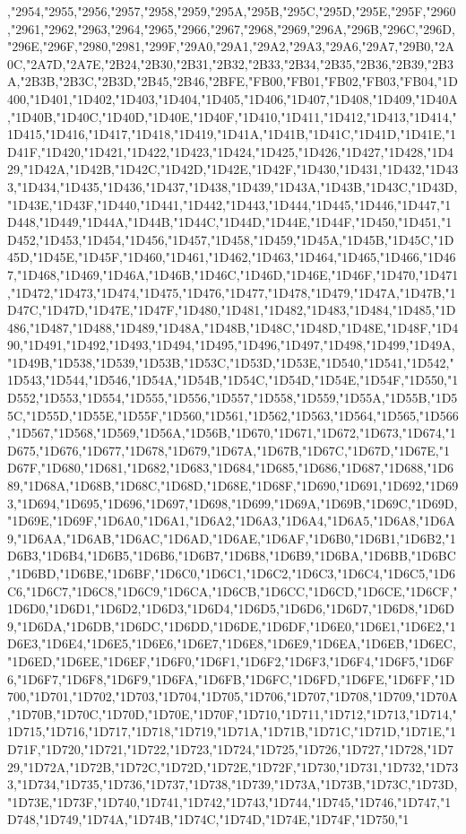 ,"2954,"2955,"2956,"2957,"2958,"2959,"295A,"295B,"295C,"295D,"295E,"295F,"2960,"2961,"2962,"2963,"2964,"2965,"2966,"2967,"2968,"2969,"296A,"296B,"296C,"296D,"296E,"296F,"2980,"2981,"299F,"29A0,"29A1,"29A2,"29A3,"29A6,"29A7,"29B0,"2A0C,"2A7D,"2A7E,"2B24,"2B30,"2B31,"2B32,"2B33,"2B34,"2B35,"2B36,"2B39,"2B3A,"2B3B,"2B3C,"2B3D,"2B45,"2B46,"2BFE,"FB00,"FB01,"FB02,"FB03,"FB04,"1D400,"1D401,"1D402,"1D403,"1D404,"1D405,"1D406,"1D407,"1D408,"1D409,"1D40A,"1D40B,"1D40C,"1D40D,"1D40E,"1D40F,"1D410,"1D411,"1D412,"1D413,"1D414,"1D415,"1D416,"1D417,"1D418,"1D419,"1D41A,"1D41B,"1D41C,"1D41D,"1D41E,"1D41F,"1D420,"1D421,"1D422,"1D423,"1D424,"1D425,"1D426,"1D427,"1D428,"1D429,"1D42A,"1D42B,"1D42C,"1D42D,"1D42E,"1D42F,"1D430,"1D431,"1D432,"1D433,"1D434,"1D435,"1D436,"1D437,"1D438,"1D439,"1D43A,"1D43B,"1D43C,"1D43D,"1D43E,"1D43F,"1D440,"1D441,"1D442,"1D443,"1D444,"1D445,"1D446,"1D447,"1D448,"1D449,"1D44A,"1D44B,"1D44C,"1D44D,"1D44E,"1D44F,"1D450,"1D451,"1D452,"1D453,"1D454,"1D456,"1D457,"1D458,"1D459,"1D45A,"1D45B,"1D45C,"1D45D,"1D45E,"1D45F,"1D460,"1D461,"1D462,"1D463,"1D464,"1D465,"1D466,"1D467,"1D468,"1D469,"1D46A,"1D46B,"1D46C,"1D46D,"1D46E,"1D46F,"1D470,"1D471,"1D472,"1D473,"1D474,"1D475,"1D476,"1D477,"1D478,"1D479,"1D47A,"1D47B,"1D47C,"1D47D,"1D47E,"1D47F,"1D480,"1D481,"1D482,"1D483,"1D484,"1D485,"1D486,"1D487,"1D488,"1D489,"1D48A,"1D48B,"1D48C,"1D48D,"1D48E,"1D48F,"1D490,"1D491,"1D492,"1D493,"1D494,"1D495,"1D496,"1D497,"1D498,"1D499,"1D49A,"1D49B,"1D538,"1D539,"1D53B,"1D53C,"1D53D,"1D53E,"1D540,"1D541,"1D542,"1D543,"1D544,"1D546,"1D54A,"1D54B,"1D54C,"1D54D,"1D54E,"1D54F,"1D550,"1D552,"1D553,"1D554,"1D555,"1D556,"1D557,"1D558,"1D559,"1D55A,"1D55B,"1D55C,"1D55D,"1D55E,"1D55F,"1D560,"1D561,"1D562,"1D563,"1D564,"1D565,"1D566,"1D567,"1D568,"1D569,"1D56A,"1D56B,"1D670,"1D671,"1D672,"1D673,"1D674,"1D675,"1D676,"1D677,"1D678,"1D679,"1D67A,"1D67B,"1D67C,"1D67D,"1D67E,"1D67F,"1D680,"1D681,"1D682,"1D683,"1D684,"1D685,"1D686,"1D687,"1D688,"1D689,"1D68A,"1D68B,"1D68C,"1D68D,"1D68E,"1D68F,"1D690,"1D691,"1D692,"1D693,"1D694,"1D695,"1D696,"1D697,"1D698,"1D699,"1D69A,"1D69B,"1D69C,"1D69D,"1D69E,"1D69F,"1D6A0,"1D6A1,"1D6A2,"1D6A3,"1D6A4,"1D6A5,"1D6A8,"1D6A9,"1D6AA,"1D6AB,"1D6AC,"1D6AD,"1D6AE,"1D6AF,"1D6B0,"1D6B1,"1D6B2,"1D6B3,"1D6B4,"1D6B5,"1D6B6,"1D6B7,"1D6B8,"1D6B9,"1D6BA,"1D6BB,"1D6BC,"1D6BD,"1D6BE,"1D6BF,"1D6C0,"1D6C1,"1D6C2,"1D6C3,"1D6C4,"1D6C5,"1D6C6,"1D6C7,"1D6C8,"1D6C9,"1D6CA,"1D6CB,"1D6CC,"1D6CD,"1D6CE,"1D6CF,"1D6D0,"1D6D1,"1D6D2,"1D6D3,"1D6D4,"1D6D5,"1D6D6,"1D6D7,"1D6D8,"1D6D9,"1D6DA,"1D6DB,"1D6DC,"1D6DD,"1D6DE,"1D6DF,"1D6E0,"1D6E1,"1D6E2,"1D6E3,"1D6E4,"1D6E5,"1D6E6,"1D6E7,"1D6E8,"1D6E9,"1D6EA,"1D6EB,"1D6EC,"1D6ED,"1D6EE,"1D6EF,"1D6F0,"1D6F1,"1D6F2,"1D6F3,"1D6F4,"1D6F5,"1D6F6,"1D6F7,"1D6F8,"1D6F9,"1D6FA,"1D6FB,"1D6FC,"1D6FD,"1D6FE,"1D6FF,"1D700,"1D701,"1D702,"1D703,"1D704,"1D705,"1D706,"1D707,"1D708,"1D709,"1D70A,"1D70B,"1D70C,"1D70D,"1D70E,"1D70F,"1D710,"1D711,"1D712,"1D713,"1D714,"1D715,"1D716,"1D717,"1D718,"1D719,"1D71A,"1D71B,"1D71C,"1D71D,"1D71E,"1D71F,"1D720,"1D721,"1D722,"1D723,"1D724,"1D725,"1D726,"1D727,"1D728,"1D729,"1D72A,"1D72B,"1D72C,"1D72D,"1D72E,"1D72F,"1D730,"1D731,"1D732,"1D733,"1D734,"1D735,"1D736,"1D737,"1D738,"1D739,"1D73A,"1D73B,"1D73C,"1D73D,"1D73E,"1D73F,"1D740,"1D741,"1D742,"1D743,"1D744,"1D745,"1D746,"1D747,"1D748,"1D749,"1D74A,"1D74B,"1D74C,"1D74D,"1D74E,"1D74F,"1D750,"1